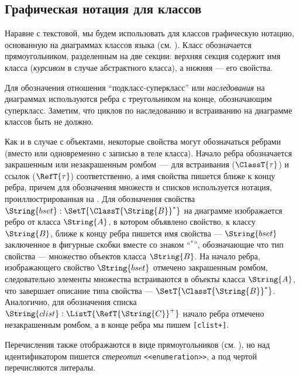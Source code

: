 \subsection{Графическая нотация для классов}

Наравне с текстовой, мы будем использовать для классов графическую нотацию, основанную на диаграммах классов языка  (см. ). Класс обозначается прямоугольником, разделенным на две секции: верхняя секция содержит имя класса (\emph{курсивом} в случае абстрактного класса), а нижняя --- его свойства.


Для обозначения отношения ``подкласс-суперкласс'' или \emph{наследования} на диаграммах используются ребра с треугольником на конце, обозначающим суперкласс. Заметим, что циклов по наследованию и встраиванию на диаграмме классов быть не должно.

Как и в случае с объектами, некоторые свойства могут обозначаться ребрами (вместо или одновременно с записью в теле класса). Начало ребра обозначается закрашенным или незакрашенным ромбом~--- для встраивания ($\ClassT{\tau}$) и ссылок ($\RefT{\tau}$) соответственно, а имя свойства пишется ближе к концу ребра, причем для обозначения множеств и списков используется нотация, проиллюстрированная на .
%
% 
Для обозначения свойства $\String{bset} : \SetT{\ClassT{\String{B}}^*}$ на диаграмме изображается ребро от класса $\String{A}$, в котором объявлено свойство, к классу $\String{B}$, ближе к концу ребра пишется имя свойства --- $\String{bset}$ заключенное в фигурные скобки вместе со знаком ``$^*$'', обозначающие что тип свойства --- множество объектов класса $\String{B}$. На  начало ребра, изображающего свойство $\String{bset}$ отмечено закрашенным ромбом, следовательно элементы множества встраиваются в объекты класса $\String{A}$, что завершает описание типа свойства --- $\SetT{\ClassT{\String{B}}^*}$. Аналогично, для обозначения списка $\String{clist} : \ListT{\RefT{\String{C}}^+}$ начало ребра отмечено незакрашенным ромбом, а в конце ребра мы пишем \texttt{\small[clist+]}.


Перечисления также отображаются в виде прямоугольников (см. ), но над идентификатором пишется \emph{стереотип} \texttt{\small<<enumeration>>}, а под чертой перечисляются литералы.

